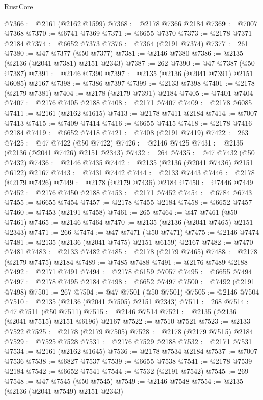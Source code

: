 \begin{lexlean}{RustCore}
\begin{coremodule}
@7366 := @2161 (@2162 @1599)
@7368 := @2178 @7366 @2184
@7369 := @7007 @7368
@7370 := @6741 @7369
@7371 := @6655 @7370
@7373 := @2178 @7371 @2184
@7374 := @6652 @7373
@7376 := @7364 (@2191 @7374)
@7377 := 261
@7380 := @47 @7377 (@50 @7377)
@7381 := @2146 @7380
@7386 := @2135 (@2136 (@2041 @7381) @2151 @2343)
@7387 := 262
@7390 := @47 @7387 (@50 @7387)
@7391 := @2146 @7390
@7397 := @2135 (@2136 (@2041 @7391) @2151 @6085) @2167
@7398 := @7386 @7397
@7399 := @2133 @7398
@7401 := @2178 (@2179 @7381)
@7404 := @2178 (@2179 @7391) @2184
@7405 := @7401 @7404
@7407 := @2176 @7405 @2188
@7408 := @2171 @7407
@7409 := @2178 @6085
@7411 := @2161 (@2162 @1615)
@7413 := @2178 @7411 @2184
@7414 := @7007 @7413
@7415 := @7409 @7414
@7416 := @6655 @7415
@7418 := @2178 @7416 @2184
@7419 := @6652 @7418
@7421 := @7408 (@2191 @7419)
@7422 := 263
@7425 := @47 @7422 (@50 @7422)
@7426 := @2146 @7425
@7431 := @2135 (@2136 (@2041 @7426) @2151 @2343)
@7432 := 264
@7435 := @47 @7432 (@50 @7432)
@7436 := @2146 @7435
@7442 := @2135 (@2136 (@2041 @7436) @2151 @6122) @2167
@7443 := @7431 @7442
@7444 := @2133 @7443
@7446 := @2178 (@2179 @7426)
@7449 := @2178 (@2179 @7436) @2184
@7450 := @7446 @7449
@7452 := @2176 @7450 @2188
@7453 := @2171 @7452
@7454 := @6784 @6743
@7455 := @6655 @7454
@7457 := @2178 @7455 @2184
@7458 := @6652 @7457
@7460 := @7453 (@2191 @7458)
@7461 := 265
@7464 := @47 @7461 (@50 @7461)
@7465 := @2146 @7464
@7470 := @2135 (@2136 (@2041 @7465) @2151 @2343)
@7471 := 266
@7474 := @47 @7471 (@50 @7471)
@7475 := @2146 @7474
@7481 := @2135 (@2136 (@2041 @7475) @2151 @6159) @2167
@7482 := @7470 @7481
@7483 := @2133 @7482
@7485 := @2178 (@2179 @7465)
@7488 := @2178 (@2179 @7475) @2184
@7489 := @7485 @7488
@7491 := @2176 @7489 @2188
@7492 := @2171 @7491
@7494 := @2178 @6159 @7057
@7495 := @6655 @7494
@7497 := @2178 @7495 @2184
@7498 := @6652 @7497
@7500 := @7492 (@2191 @7498)
@7501 := 267
@7504 := @47 @7501 (@50 @7501)
@7505 := @2146 @7504
@7510 := @2135 (@2136 (@2041 @7505) @2151 @2343)
@7511 := 268
@7514 := @47 @7511 (@50 @7511)
@7515 := @2146 @7514
@7521 := @2135 (@2136 (@2041 @7515) @2151 @6196) @2167
@7522 := @7510 @7521
@7523 := @2133 @7522
@7525 := @2178 (@2179 @7505)
@7528 := @2178 (@2179 @7515) @2184
@7529 := @7525 @7528
@7531 := @2176 @7529 @2188
@7532 := @2171 @7531
@7534 := @2161 (@2162 @1645)
@7536 := @2178 @7534 @2184
@7537 := @7007 @7536
@7538 := @6827 @7537
@7539 := @6655 @7538
@7541 := @2178 @7539 @2184
@7542 := @6652 @7541
@7544 := @7532 (@2191 @7542)
@7545 := 269
@7548 := @47 @7545 (@50 @7545)
@7549 := @2146 @7548
@7554 := @2135 (@2136 (@2041 @7549) @2151 @2343)

\end{coremodule}
\end{lexlean}

